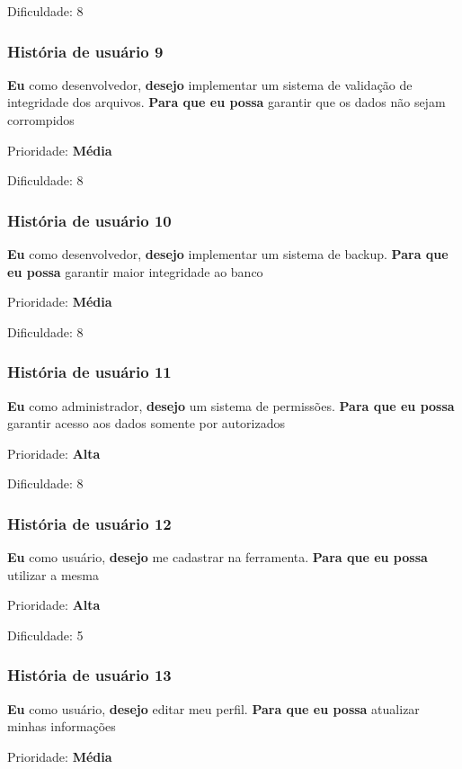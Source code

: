     Dificuldade: 8

  \subsubsection{História de usuário 9}
    \textbf{Eu} como desenvolvedor, \textbf{desejo} implementar um sistema de validação de integridade dos arquivos. \textbf{Para que eu possa} garantir que os dados não sejam corrompidos 

    Prioridade: \textbf{Média}

    Dificuldade: 8

  \subsubsection{História de usuário 10}
    \textbf{Eu} como desenvolvedor, \textbf{desejo} implementar um sistema de backup. \textbf{Para que eu possa} garantir maior integridade ao banco

    Prioridade: \textbf{Média}

    Dificuldade: 8

  \subsubsection{História de usuário 11}
    \textbf{Eu} como administrador, \textbf{desejo} um sistema de permissões. \textbf{Para que eu possa} garantir acesso aos dados somente por autorizados 

    Prioridade: \textbf{Alta}

    Dificuldade: 8

  \subsubsection{História de usuário 12}
    \textbf{Eu} como usuário, \textbf{desejo} me cadastrar na ferramenta. \textbf{Para que eu possa} utilizar a mesma 

    Prioridade: \textbf{Alta}

    Dificuldade: 5

  \subsubsection{História de usuário 13}
    \textbf{Eu} como usuário, \textbf{desejo} editar meu perfil. \textbf{Para que eu possa} atualizar minhas informações

    Prioridade: \textbf{Média}

